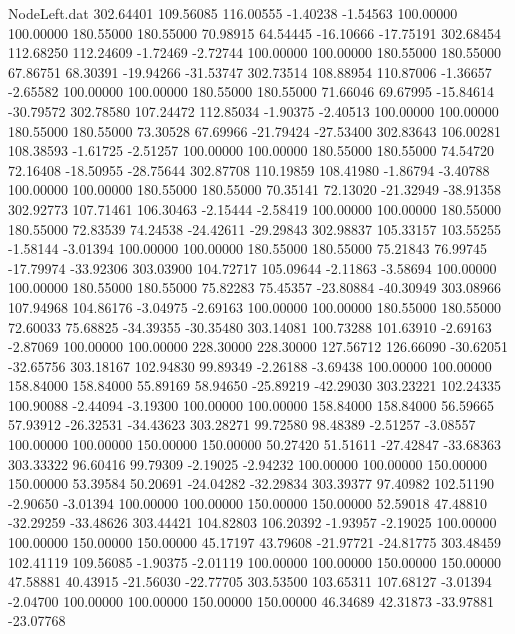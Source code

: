 \begin{filecontents}{NodeLeft.dat}
 302.64401  109.56085  116.00555    -1.40238   -1.54563  100.00000  100.00000  180.55000  180.55000   70.98915   64.54445  -16.10666  -17.75191
 302.68454  112.68250  112.24609    -1.72469   -2.72744  100.00000  100.00000  180.55000  180.55000   67.86751   68.30391  -19.94266  -31.53747
 302.73514  108.88954  110.87006    -1.36657   -2.65582  100.00000  100.00000  180.55000  180.55000   71.66046   69.67995  -15.84614  -30.79572
 302.78580  107.24472  112.85034    -1.90375   -2.40513  100.00000  100.00000  180.55000  180.55000   73.30528   67.69966  -21.79424  -27.53400
 302.83643  106.00281  108.38593    -1.61725   -2.51257  100.00000  100.00000  180.55000  180.55000   74.54720   72.16408  -18.50955  -28.75644
 302.87708  110.19859  108.41980    -1.86794   -3.40788  100.00000  100.00000  180.55000  180.55000   70.35141   72.13020  -21.32949  -38.91358
 302.92773  107.71461  106.30463    -2.15444   -2.58419  100.00000  100.00000  180.55000  180.55000   72.83539   74.24538  -24.42611  -29.29843
 302.98837  105.33157  103.55255    -1.58144   -3.01394  100.00000  100.00000  180.55000  180.55000   75.21843   76.99745  -17.79974  -33.92306
 303.03900  104.72717  105.09644    -2.11863   -3.58694  100.00000  100.00000  180.55000  180.55000   75.82283   75.45357  -23.80884  -40.30949
 303.08966  107.94968  104.86176    -3.04975   -2.69163  100.00000  100.00000  180.55000  180.55000   72.60033   75.68825  -34.39355  -30.35480
 303.14081  100.73288  101.63910    -2.69163   -2.87069  100.00000  100.00000  228.30000  228.30000  127.56712  126.66090  -30.62051  -32.65756
 303.18167  102.94830   99.89349    -2.26188   -3.69438  100.00000  100.00000  158.84000  158.84000   55.89169   58.94650  -25.89219  -42.29030
 303.23221  102.24335  100.90088    -2.44094   -3.19300  100.00000  100.00000  158.84000  158.84000   56.59665   57.93912  -26.32531  -34.43623
 303.28271   99.72580   98.48389    -2.51257   -3.08557  100.00000  100.00000  150.00000  150.00000   50.27420   51.51611  -27.42847  -33.68363
 303.33322   96.60416   99.79309    -2.19025   -2.94232  100.00000  100.00000  150.00000  150.00000   53.39584   50.20691  -24.04282  -32.29834
 303.39377   97.40982  102.51190    -2.90650   -3.01394  100.00000  100.00000  150.00000  150.00000   52.59018   47.48810  -32.29259  -33.48626
 303.44421  104.82803  106.20392    -1.93957   -2.19025  100.00000  100.00000  150.00000  150.00000   45.17197   43.79608  -21.97721  -24.81775
 303.48459  102.41119  109.56085    -1.90375   -2.01119  100.00000  100.00000  150.00000  150.00000   47.58881   40.43915  -21.56030  -22.77705
 303.53500  103.65311  107.68127    -3.01394   -2.04700  100.00000  100.00000  150.00000  150.00000   46.34689   42.31873  -33.97881  -23.07768

\end{filecontents}
